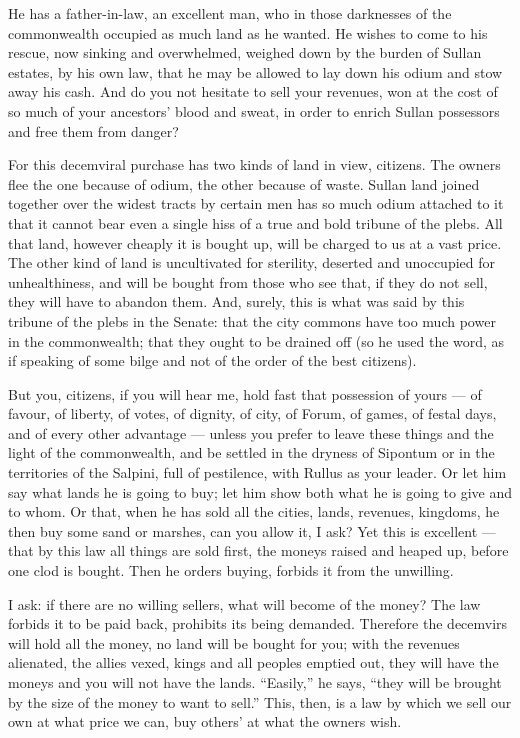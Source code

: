  He has a father-in-law, an excellent man, who in those darknesses of the commonwealth occupied as much land as he wanted. He wishes to come to his rescue, now sinking and overwhelmed, weighed down by the burden of Sullan estates, by his own law, that he may be allowed to lay down his odium and stow away his cash. And do you not hesitate to sell your revenues, won at the cost of so much of your ancestors' blood and sweat, in order to enrich Sullan possessors and free them from danger?

 For this decemviral purchase has two kinds of land in view, citizens. The owners flee the one because of odium, the other because of waste. Sullan land joined together over the widest tracts by certain men has so much odium attached to it that it cannot bear even a single hiss of a true and bold tribune of the plebs. All that land, however cheaply it is bought up, will be charged to us at a vast price. The other kind of land is uncultivated for sterility, deserted and unoccupied for unhealthiness, and will be bought from those who see that, if they do not sell, they will have to abandon them. And, surely, this is what was said by this tribune of the plebs in the Senate: that the city commons have too much power in the commonwealth; that they ought to be drained off (so he used the word, as if speaking of some bilge and not of the order of the best citizens).

 But you, citizens, if you will hear me, hold fast that possession of yours --- of favour, of liberty, of votes, of dignity, of city, of Forum, of games, of festal days, and of every other advantage --- unless you prefer to leave these things and the light of the commonwealth, and be settled in the dryness of Sipontum or in the territories of the Salpini, full of pestilence, with Rullus as your leader. Or let him say what lands he is going to buy; let him show both what he is going to give and to whom. Or that, when he has sold all the cities, lands, revenues, kingdoms, he then buy some sand or marshes, can you allow it, I ask? Yet this is excellent --- that by this law all things are sold first, the moneys raised and heaped up, before one clod is bought. Then he orders buying, forbids it from the unwilling.

 I ask: if there are no willing sellers, what will become of the money? The law forbids it to be paid back, prohibits its being demanded. Therefore the decemvirs will hold all the money, no land will be bought for you; with the revenues alienated, the allies vexed, kings and all peoples emptied out, they will have the moneys and you will not have the lands. ``Easily,'' he says, ``they will be brought by the size of the money to want to sell.'' This, then, is a law by which we sell our own at what price we can, buy others' at what the owners wish.

